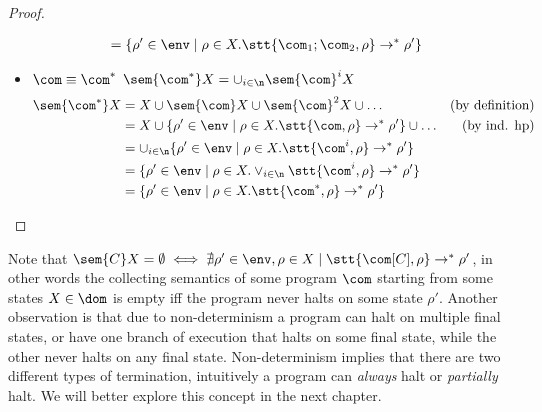 \begin{proof}
\begin{itemize}
\begin{align*}
      & = \{\rho' \in\env \mid \rho \in X . \stt{\com_1;\com_2, \rho} \to^* \rho'\}
    \end{align*}
  \item \(\com \equiv \com^*\) \newline
    \(\sem{\com^*}X = \cup_{i\in\n}\sem{\com}^i X\)
    \begin{align*}
      \sem{\com^*}X & = X \cup \sem{\com}X \cup \sem{\com}^2X \cup \dots & \text{(by definition)}\\
      & = X \cup \{\rho' \in\env \mid \rho \in X . \stt{\com,\rho} \to^* \rho'\} \cup %
      \dots & \text{(by ind. hp)}\\
      & = \cup_{i\in\n} \{\rho' \in\env \mid \rho \in X . \stt{\com^i, \rho} \to^*  \rho'\} \\
      & = \{\rho' \in\env \mid \rho \in X . \vee_{i\in\n} \stt{\com^i, \rho} \to^* \rho'\} \\
      & = \{\rho' \in\env \mid \rho \in X . \stt{\com^*, \rho} \to^* \rho'\}
    \end{align*} \qedhere
  \end{itemize}
\end{proof}

Note that
\(\sem{C}X = \emptyset \iff \nexists \rho'\in\env, \rho \in X \mid
\stt{\com[C],\rho} \to^* \rho'\), in other words the collecting
semantics of some program \(\com\) starting from some states
\(X\in\dom\) is empty iff the program never halts on some state
\(\rho'\). Another observation is that due to non-determinism a
program can halt on multiple final states, or have one branch of
execution that halts on some final state, while the other never halts
on any final state. Non-determinism implies that there are two
different types of termination, intuitively a program can
\emph{always} halt or \emph{partially} halt. We will better explore
this concept in the next chapter.
